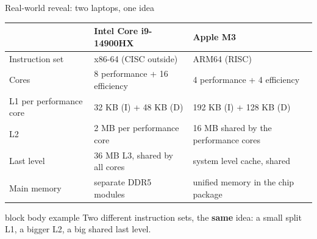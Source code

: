 \documentclass[aspectratio=169,10pt]{beamer}
\newcommand{\keymsg}[1]{%
  \begin{beamercolorbox}[rounded=true,sep=0.1cm,wd=\textwidth]{block body example}
    \centering\footnotesize #1
  \end{beamercolorbox}}
\begin{document}
\begin{frame}{Real-world reveal: two laptops, one idea}
  \begin{center}
    \footnotesize
    \renewcommand{\arraystretch}{1.25}
    \begin{tabular}{lll}
      \toprule
      & \textbf{Intel Core i9-14900HX} & \textbf{Apple M3} \\
      \midrule
      Instruction set & x86-64 (CISC outside) & ARM64 (RISC) \\
      Cores & 8 performance + 16 efficiency & 4 performance + 4 efficiency \\
      L1 per performance core & 32 KB (I) + 48 KB (D) & 192 KB (I) + 128 KB (D) \\
      L2 & 2 MB per performance core & 16 MB shared by the performance cores \\
      Last level & 36 MB L3, shared by all cores & system level cache, shared \\
      Main memory & separate DDR5 modules & unified memory in the chip package \\
      \bottomrule
    \end{tabular}
  \end{center}
  \vfill
  \keymsg{Two different instruction sets, the \textbf{same} idea: a small split L1, a bigger L2, a big shared last level.}
\end{frame}
\end{document}
